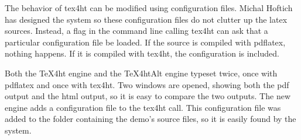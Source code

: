 \documentclass[11pt, oneside]{article}   	%
\begin{document}
The behavior of tex4ht can be modified using configuration files. Michal Hoftich has designed the system so these configuration files do not clutter up the latex sources. Instead, a flag in the command line calling tex4ht can ask that a particular configuration file be loaded. If the source is compiled with pdflatex, nothing happens. If it is compiled with
tex4ht, the configuration is included.

Both the TeX4ht engine and the TeX4htAlt engine typeset twice, once with pdflatex and once with tex4ht. Two windows are opened, showing both the pdf output and the html output, so it is easy to compare the two outputs.
The new engine  adds a configuration file to the tex4ht call.  This configuration file was added to the folder containing the demo's source files, so it is easily found by the system.
\end{document}
